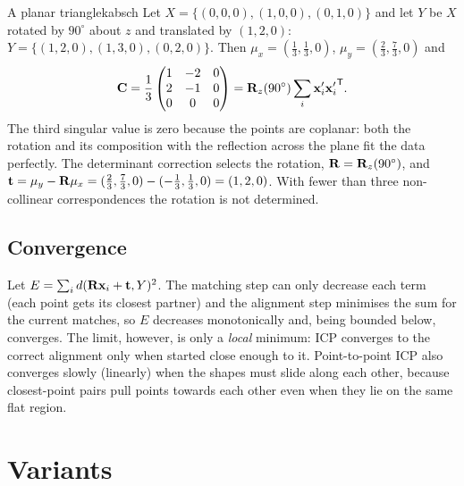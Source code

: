 \begin{example}{A planar triangle}{kabsch}
Let $X=\{(0,0,0),(1,0,0),(0,1,0)\}$ and let $Y$ be $X$ rotated by $90^\circ$ about $z$ and
translated by $(1,2,0)$: $Y=\{(1,2,0),(1,3,0),(0,2,0)\}$. Then $\mu_x=(\tfrac13,\tfrac13,0)$,
$\mu_y=(\tfrac23,\tfrac73,0)$ and
\[
\mathbf{C}=\frac13\begin{pmatrix}1&-2&0\\2&-1&0\\0&0&0\end{pmatrix}=\mathbf{R}_z(90^\circ)\sum_i\mathbf{x}'_i{\mathbf{x}'_i}^{\mathsf{T}} .
\]
The third singular value is zero because the points are coplanar: both the rotation and its
composition with the reflection across the plane fit the data perfectly. The determinant
correction selects the rotation, $\mathbf{R}=\mathbf{R}_z(90^\circ)$, and $\mathbf{t}=\mu_y-\mathbf{R}\mu_x=(\tfrac23,\tfrac73,0)-(-\tfrac13,\tfrac13,0)=(1,2,0)$.
With fewer than three non-collinear correspondences the rotation is not determined.
\end{example}

\subsection{Convergence}

Let $E=\sum_id(\mathbf{R}\mathbf{x}_i+\mathbf{t},Y)^2$. The matching step can only decrease each term (each point gets
its closest partner) and the alignment step minimises the sum for the current matches, so $E$
decreases monotonically and, being bounded below, converges. The limit, however, is only a
\emph{local} minimum: ICP converges to the correct alignment only when started close enough to it.
Point-to-point ICP also converges slowly (linearly) when the shapes must slide along each other,
because closest-point pairs pull points towards each other even when they lie on the same flat
region.


\section{Variants}

